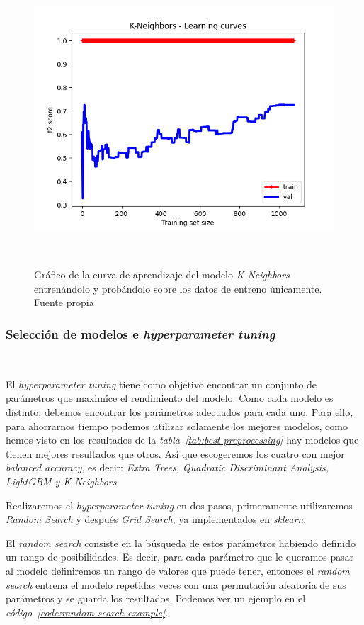 \begin{figure}[!ht]
    \centering
    \includegraphics[width=0.7\linewidth]{media/images/learing-curves-knn.png}
    \caption{Gráfico de la curva de aprendizaje del modelo \textit{K-Neighbors} entrenándolo y probándolo sobre los datos de entreno únicamente. Fuente propia}\ \label{fig:lc-knn}
\end{figure}


\subsubsection{Selección de modelos e \textit{hyperparameter tuning}}\ \label{sec:i1-seleccion}

El \textit{hyperparameter tuning} tiene como objetivo encontrar un conjunto de parámetros que maximice el rendimiento del modelo. 
Como cada modelo es distinto, debemos encontrar los parámetros adecuados para cada uno. 
Para ello, para ahorrarnos tiempo podemos utilizar solamente los mejores modelos, como hemos visto en los resultados de la \textit{tabla\ \ref{tab:best-preprocessing}}
hay modelos que tienen mejores resultados que otros.
Así que escogeremos los cuatro con mejor \textit{balanced accuracy}, es decir: \textit{Extra Trees, Quadratic Discriminant Analysis, LightGBM y K-Neighbors}.

Realizaremos el \textit{hyperparameter tuning} en dos pasos, primeramente utilizaremos \textit{Random Search} y después \textit{Grid Search}, ya implementados en \textit{sklearn}.

El \textit{random search} consiste en la búsqueda de estos parámetros habiendo definido un rango de posibilidades. Es decir, para cada parámetro que le queramos
pasar al modelo definiremos un rango de valores que puede tener, entonces el \textit{random search} entrena el modelo repetidas veces con una permutación aleatoria de sus 
parámetros y se guarda los resultados. Podemos ver un ejemplo en el \textit{código\ \ref{code:random-search-example}}.

